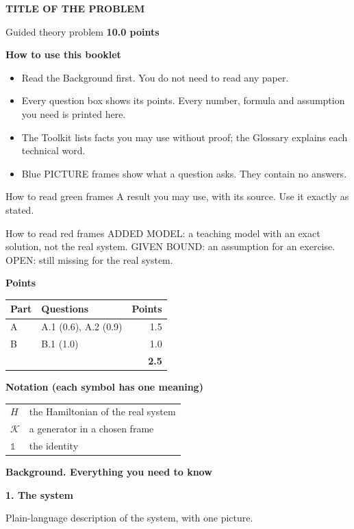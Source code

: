 \documentclass[11pt,a4paper]{article}
\newcommand{\booktitle}{TITLE OF THE PROBLEM}
\newcommand{\id}{\mathds 1}
\newcommand{\pagetitle}[1]{{\large\bfseries\color{ink}#1}\par\vspace{4pt}}
\newcommand{\smallheading}[1]{\par\Needspace{6\baselineskip}\medskip\textbf{#1}\par}
\newcommand{\nextpage}{\clearpage}
\begin{document}
{\LARGE\bfseries\color{ink}\booktitle}\par
{\large Guided theory problem \hfill \textbf{10.0 points}}

\smallheading{How to use this booklet}
\begin{itemize}[leftmargin=6mm,itemsep=2pt,topsep=2pt]
\item Read the Background first. You do not need to read any paper.
\item Every question box shows its points. Every number, formula and assumption you need is printed here.
\item The Toolkit lists facts you may use without proof; the Glossary explains each technical word.
\item Blue PICTURE frames show what a question asks. They contain no answers.
\end{itemize}

\begin{greenbox}{How to read green frames}
A result you may use, with its source. Use it exactly as stated.
\end{greenbox}
\begin{redbox}{How to read red frames}
ADDED MODEL: a teaching model with an exact solution, not the real system. GIVEN BOUND: an assumption for an exercise. OPEN: still missing for the real system.
\end{redbox}

\smallheading{Points}
{\small\begin{tabularx}{\textwidth}{@{}p{9mm}Y r@{}}\toprule
Part&Questions&Points\\\midrule
A&A.1 (0.6), A.2 (0.9)&1.5\\
B&B.1 (1.0)&1.0\\\midrule
&&\textbf{2.5}\\\bottomrule
\end{tabularx}}

\smallheading{Notation (each symbol has one meaning)}
{\small\begin{tabularx}{\textwidth}{@{}p{30mm}Y@{}}\toprule
$H$&the Hamiltonian of the real system\\
$\mathcal K$&a generator in a chosen frame\\
$\id$&the identity\\\bottomrule
\end{tabularx}}

\nextpage
\pagetitle{Background. Everything you need to know}
\smallheading{1. The system}
Plain-language description of the system, with one picture.
\end{document}
